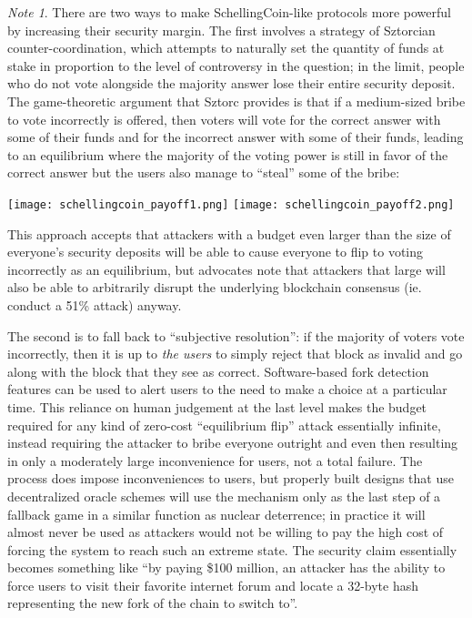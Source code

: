 \documentclass[11pt,a4paper]{article}
\theoremstyle{plain}
\theoremstyle{definition}
\theoremstyle{remark}
\newtheorem*{note}{Note}
\begin{document}
\begin{note}
There are two ways to make SchellingCoin-like protocols more powerful by increasing their security margin. The first involves a strategy of Sztorcian counter-coordination\cite{sztorc}, which attempts to naturally set the quantity of funds at stake in proportion to the level of controversy in the question; in the limit, people who do not vote alongside the majority answer lose their entire security deposit. The game-theoretic argument that Sztorc provides\cite{sztorc2} is that if a medium-sized bribe to vote incorrectly is offered, then voters will vote for the correct answer with some of their funds and for the incorrect answer with some of their funds, leading to an equilibrium where the majority of the voting power is still in favor of the correct answer but the users also manage to ``steal'' some of the bribe:

\begin{center}
\texttt{[image: schellingcoin\_payoff1.png]}
\texttt{[image: schellingcoin\_payoff2.png]}
\end{center}

This approach accepts that attackers with a budget even larger than the size of everyone's security deposits will be able to cause everyone to flip to voting incorrectly as an equilibrium, but advocates note that attackers that large will also be able to arbitrarily disrupt the underlying blockchain consensus (ie. conduct a 51\% attack) anyway.

The second is to fall back to ``subjective resolution'': if the majority of voters vote incorrectly, then it is up to \emph{the users} to simply reject that block as invalid and go along with the block that they see as correct. Software-based fork detection features can be used to alert users to the need to make a choice at a particular time. This reliance on human judgement at the last level makes the budget required for any kind of zero-cost ``equilibrium flip'' attack essentially infinite, instead requiring the attacker to bribe everyone outright and even then resulting in only a moderately large inconvenience for users, not a total failure. The process does impose inconveniences to users, but properly built designs that use decentralized oracle schemes will use the mechanism only as the last step of a fallback game in a similar function as nuclear deterrence; in practice it will almost never be used as attackers would not be willing to pay the high cost of forcing the system to reach such an extreme state. The security claim essentially becomes something like ``by paying \$100 million, an attacker has the ability to force users to visit their favorite internet forum and locate a 32-byte hash representing the new fork of the chain to switch to''.
\end{note}
\end{document}
